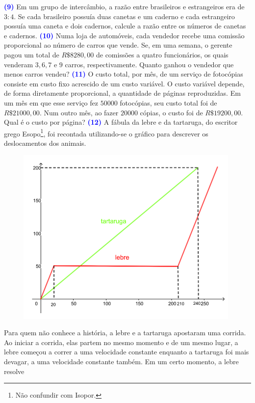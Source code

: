 \documentclass[12pt, a4paper]{article}
\begin{document}
\textcolor{blue}{\bf(9)} Em um grupo de intercâmbio, a razão entre brasileiros e estrangeiros era de $3 : 4.$ Se
cada brasileiro possuía duas canetas e um caderno e cada estrangeiro possuía uma caneta e dois cadernos, calcule a razão entre os números de canetas e cadernos.
\newline\newline
\textcolor{blue}{\bf(10)} Numa loja de automóveis, cada vendedor recebe uma comissão proporcional ao número de carros que vende. Se, em uma semana, o gerente pagou um total de $R\$ 8280,00$ de comissões a quatro funcionários, os quais venderam $3, 6, 7$ e $9$ carros, respectivamente. Quanto ganhou o vendedor que menos carros vendeu?
\newline\newline
\textcolor{blue}{\bf(11)} O custo total, por mês, de um serviço de fotocópias consiste em custo fixo acrescido de um custo variável. O custo variável depende, de forma diretamente proporcional, a quantidade de páginas reproduzidas. Em um mês em que esse serviço fez $50000$ fotocópias, seu custo total foi de $R\$ 21000,00.$ Num outro mês, ao fazer $20000$
cópias, o custo foi de $R\$ 19200,00.$ Qual é o custo por página?
\newline
\newline
\textcolor{blue}{\bf(12)} A fábula da lebre e da tartaruga, do escritor grego Esopo\footnote{Não confundir com Isopor.}, foi recontada utilizando-se o gráfico para descrever os deslocamentos dos animais.
\begin{figure}[!h]
    \centering
 \includegraphics[scale=1.1]{Figuras/20enc2ciclo1.png}
\end{figure}
Para quem não conhece a história, a lebre e a tartaruga apostaram uma corrida. Ao iniciar a corrida, elas partem no mesmo momento e de um mesmo lugar, a lebre começou a correr a uma velocidade constante enquanto a tartaruga foi mais devagar, a uma velocidade constante também. Em um certo momento, a lebre resolve
\end{document}
